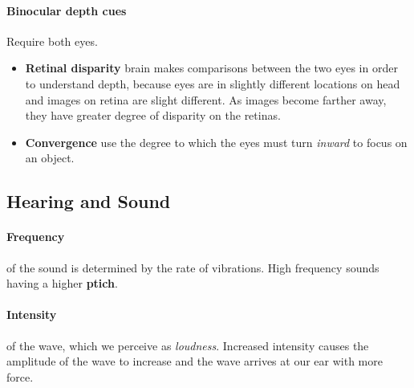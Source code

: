 \documentclass{article}
\begin{document}
	\paragraph{Binocular depth cues} Require both eyes.
	\begin{itemize}
		\item \textbf{Retinal disparity} brain makes comparisons between the two eyes in order to understand depth, because eyes are in slightly different locations on head and images on retina are slight different. As images become farther away, they have greater degree of disparity on the retinas.
		\item \textbf{Convergence} use the degree to which the eyes must turn \emph{inward} to focus on an object.
	\end{itemize}
	\subsection{Hearing and Sound}
	\paragraph{Frequency} of the sound is determined by the rate of vibrations. High frequency sounds having a higher \textbf{ptich}.
	\paragraph{Intensity} of the wave, which we perceive as \emph{loudness}. Increased intensity causes the amplitude of the wave to increase and the wave arrives at our ear with more force.
\end{document}

